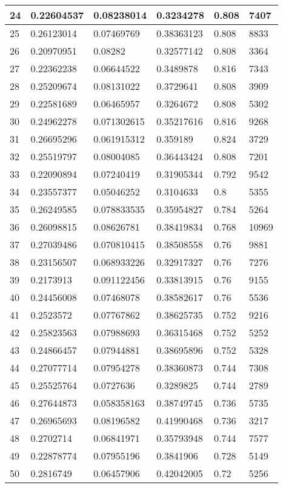 \begin{longtable}{|l|l|l|l|l|l|}
24 & 0.22604537 & 0.08238014 & 0.3234278 & 0.808 & 7407 \\ \hline 
25 & 0.26123014 & 0.07469769 & 0.38363123 & 0.808 & 8833 \\ \hline 
26 & 0.20970951 & 0.08282 & 0.32577142 & 0.808 & 3364 \\ \hline 
27 & 0.22362238 & 0.06644522 & 0.3489878 & 0.816 & 7343 \\ \hline 
28 & 0.25209674 & 0.08131022 & 0.3729641 & 0.808 & 3909 \\ \hline 
29 & 0.22581689 & 0.06465957 & 0.3264672 & 0.808 & 5302 \\ \hline 
30 & 0.24962278 & 0.071302615 & 0.35217616 & 0.816 & 9268 \\ \hline 
31 & 0.26695296 & 0.061915312 & 0.359189 & 0.824 & 3729 \\ \hline 
32 & 0.25519797 & 0.08004085 & 0.36443424 & 0.808 & 7201 \\ \hline 
33 & 0.22090894 & 0.07240419 & 0.31905344 & 0.792 & 9542 \\ \hline 
34 & 0.23557377 & 0.05046252 & 0.3104633 & 0.8 & 5355 \\ \hline 
35 & 0.26249585 & 0.078833535 & 0.35954827 & 0.784 & 5264 \\ \hline 
36 & 0.26098815 & 0.08626781 & 0.38419834 & 0.768 & 10969 \\ \hline 
37 & 0.27039486 & 0.070810415 & 0.38508558 & 0.76 & 9881 \\ \hline 
38 & 0.23156507 & 0.068933226 & 0.32917327 & 0.76 & 7276 \\ \hline 
39 & 0.2173913 & 0.091122456 & 0.33813915 & 0.76 & 9155 \\ \hline 
40 & 0.24456008 & 0.07468078 & 0.38582617 & 0.76 & 5536 \\ \hline 
41 & 0.2523572 & 0.07767862 & 0.38625735 & 0.752 & 9216 \\ \hline 
42 & 0.25823563 & 0.07988693 & 0.36315468 & 0.752 & 5252 \\ \hline 
43 & 0.24866457 & 0.07944881 & 0.38695896 & 0.752 & 5328 \\ \hline 
44 & 0.27077714 & 0.07954278 & 0.38360873 & 0.744 & 7308 \\ \hline 
45 & 0.25525764 & 0.0727636 & 0.3289825 & 0.744 & 2789 \\ \hline 
46 & 0.27644873 & 0.058358163 & 0.38749745 & 0.736 & 5735 \\ \hline 
47 & 0.26965693 & 0.08196582 & 0.41990468 & 0.736 & 3217 \\ \hline 
48 & 0.2702714 & 0.06841971 & 0.35793948 & 0.744 & 7577 \\ \hline 
49 & 0.22878774 & 0.07955196 & 0.3841906 & 0.728 & 5149 \\ \hline 
50 & 0.2816749 & 0.06457906 & 0.42042005 & 0.72 & 5256 \\ \hline 
\end{longtable}